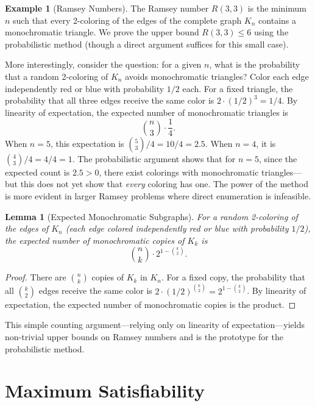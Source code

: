 \documentclass[twoside,12pt]{book}
\theoremstyle{plain}
\newtheorem{lemma}[theorem]{Lemma}
\theoremstyle{definition}
\newtheorem{example}[theorem]{Example}
\theoremstyle{remark}
\begin{document}
\begin{example}[Ramsey Numbers]
\label{ex:ramsey}
The Ramsey number $R(3,3)$ is the minimum $n$ such that every 2-coloring
of the edges of the complete graph $K_n$ contains a monochromatic triangle.
We prove the upper bound $R(3,3) \leq 6$ using the probabilistic method
(though a direct argument suffices for this small case).

More interestingly, consider the question: for a given $n$, what is the
probability that a random 2-coloring of $K_n$ avoids monochromatic
triangles? Color each edge independently red or blue with probability
$1/2$ each. For a fixed triangle, the probability that all three edges
receive the same color is $2 \cdot (1/2)^3 = 1/4$. By linearity of
expectation, the expected number of monochromatic triangles is
\[
\binom{n}{3} \cdot \frac{1}{4}.
\]
When $n = 5$, this expectation is $\binom{5}{3}/4 = 10/4 = 2.5$. When
$n = 4$, it is $\binom{4}{3}/4 = 4/4 = 1$. The probabilistic argument
shows that for $n = 5$, since the expected count is $2.5 > 0$, there
exist colorings with monochromatic triangles---but this does not yet show
that \emph{every} coloring has one. The power of the method is more
evident in larger Ramsey problems where direct enumeration is infeasible.
\end{example}

\begin{lemma}[Expected Monochromatic Subgraphs]
\label{lem:monochromatic}
For a random 2-coloring of the edges of $K_n$ (each edge colored independently
red or blue with probability $1/2$), the expected number of monochromatic
copies of $K_k$ is
\[
\binom{n}{k} \cdot 2^{1 - \binom{k}{2}}.
\]
\end{lemma}

\begin{proof}
There are $\binom{n}{k}$ copies of $K_k$ in $K_n$. For a fixed copy, the
probability that all $\binom{k}{2}$ edges receive the same color is
$2 \cdot (1/2)^{\binom{k}{2}} = 2^{1 - \binom{k}{2}}$. By linearity of
expectation, the expected number of monochromatic copies is the product.
\end{proof}

This simple counting argument---relying only on linearity of
expectation---yields non-trivial upper bounds on Ramsey numbers and is
the prototype for the probabilistic method.

\section{Maximum Satisfiability}
\label{sec:maxsat}
\end{document}
